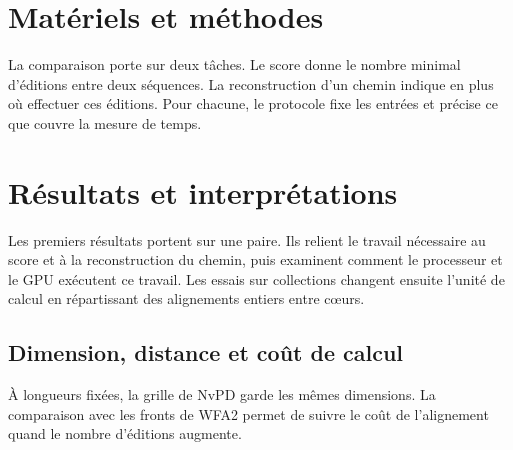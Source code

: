 \documentclass[10pt,a4paper]{article}
\begin{document}
\begin{abstract}
NvPD parallélise le calcul des colonnes de la grille de distance d’édition. Sur cinq paires d’un million de bases à 10\,\% d’éditions introduites, NvPD sur GPU devance Edlib et WFA2 sur un cœur Grace. À 100\,000 bases, le répartiteur choisit WFA2 à 5\,\% et NvPD sur GPU à 10\,\%, avec un gain de 30,69\,\% sur WFA2 dans ce dernier cas. Sur le chromosome~1 maternel de HG002, le calcul par fragments prend 28,19\,ms, contre 87,18\,ms pour WFA2 sur le même cœur EPYC. Sur les chromosomes~1 à~4 de CHM13, une copie locale par puce Grace raccourcit la commande en moyenne dès 25 alignements. Le gain atteint 492\,ms à 64 alignements. Sur 64 génomes du SARS-CoV-2, le choix du solveur par paire réduit de 7,9\,\% le temps d’Edlib seul sur quatre cœurs. À demi-largeur de bande 323, UPGMA et Neighbor-Joining retrouvent les topologies de référence malgré deux distances surestimées.
\end{abstract}
\fullcontents\clearpage


\section{Matériels et méthodes}\label{sec:algorithms}
La comparaison porte sur deux tâches. Le score donne le nombre minimal d’éditions entre deux séquences. La reconstruction d’un chemin indique en plus où effectuer ces éditions. Pour chacune, le protocole fixe les entrées et précise ce que couvre la mesure de temps.



\section{Résultats et interprétations}\label{sec:results}
Les premiers résultats portent sur une paire. Ils relient le travail nécessaire au score et à la reconstruction du chemin, puis examinent comment le processeur et le GPU exécutent ce travail. Les essais sur collections changent ensuite l’unité de calcul en répartissant des alignements entiers entre cœurs.
\subsection{Dimension, distance et coût de calcul}\label{sec:experiments}
À longueurs fixées, la grille de NvPD garde les mêmes dimensions. La comparaison avec les fronts de WFA2 permet de suivre le coût de l’alignement quand le nombre d’éditions augmente.


\end{document}
